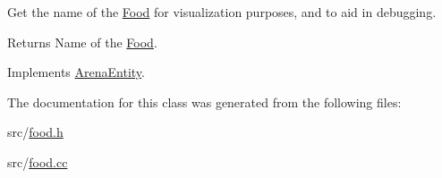 Get the name of the \mbox{\hyperlink{class_food}{Food}} for visualization purposes, and to aid in debugging. 

\begin{DoxyReturn}{Returns}
Name of the \mbox{\hyperlink{class_food}{Food}}. 
\end{DoxyReturn}


Implements \mbox{\hyperlink{class_arena_entity_ad43152003033cf01ad86eeff1990b69a}{Arena\+Entity}}.



The documentation for this class was generated from the following files\+:\begin{DoxyCompactItemize}
\item 
src/\mbox{\hyperlink{food_8h}{food.\+h}}\item 
src/\mbox{\hyperlink{food_8cc}{food.\+cc}}\end{DoxyCompactItemize}
